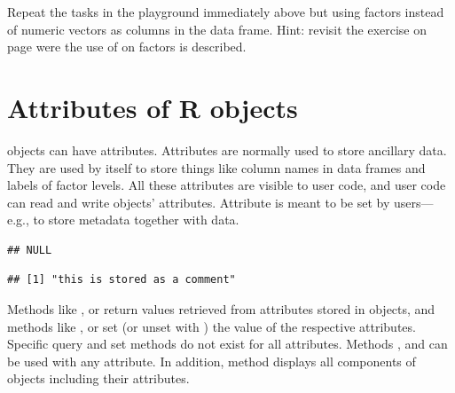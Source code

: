 \documentclass[krantz2]{krantz}\usepackage{knitr}
\begin{document}
\begin{advplayground}
Repeat the tasks in the playground immediately above but using factors instead of numeric vectors as columns in the data frame. Hint: revisit the exercise on page \pageref{calc:ADVPG:order:sort} were the use of  on factors is described.
\end{advplayground}




\section{Attributes of R objects}\label{sec:calc:attributes}

\Rlang objects can have attributes. Attributes are normally used to store ancillary data. They are used by \Rlang itself to store things like column names in data frames and labels of factor levels. All these attributes are visible to user code, and user code can read and write objects' attributes. Attribute  is meant to be set by users---e.g.,  to store metadata together with data.

\begin{knitrout}\footnotesize
{}\color{fgcolor}\begin{kframe}
\begin{alltt}
 \hlkwb{<-} \hlstd{(} \hlstd{=} \hlopt{:}\hlstd{,}  \hlstd{=} \hlstd{,}  \hlstd{=} \hlstd{(}\hlstd{,} \hlstd{))}
\end{alltt}
\begin{verbatim}
## NULL
\end{verbatim}
\begin{alltt}
 \hlkwb{<-} 
\end{alltt}
\begin{verbatim}
## [1] "this is stored as a comment"
\end{verbatim}
\end{kframe}
\end{knitrout}

Methods like ,  or  return values retrieved from attributes stored in \Rlang objects, and methods like ,  or  set (or unset with ) the value of the respective attributes. Specific query and set methods do not exist for all attributes. Methods ,  and  can be used with any attribute. In addition, method  displays all components of \Rlang objects including their attributes.
\end{document}
